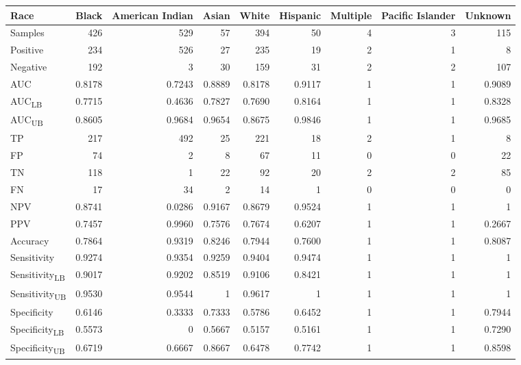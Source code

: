 \begin{tabular}{lrrrrrrrr}
\toprule
Race & Black & American Indian & Asian & White & Hispanic & Multiple & Pacific Islander & Unknown \\
\midrule
Samples & 426 & 529 & 57 & 394 & 50 & 4 & 3 & 115 \\
Positive & 234 & 526 & 27 & 235 & 19 & 2 & 1 & 8 \\
Negative & 192 & 3 & 30 & 159 & 31 & 2 & 2 & 107 \\
AUC & 0.8178 & 0.7243 & 0.8889 & 0.8178 & 0.9117 & 1 & 1 & 0.9089 \\
AUC\textsubscript{LB} & 0.7715 & 0.4636 & 0.7827 & 0.7690 & 0.8164 & 1 & 1 & 0.8328 \\
AUC\textsubscript{UB} & 0.8605 & 0.9684 & 0.9654 & 0.8675 & 0.9846 & 1 & 1 & 0.9685 \\
TP & 217 & 492 & 25 & 221 & 18 & 2 & 1 & 8 \\
FP & 74 & 2 & 8 & 67 & 11 & 0 & 0 & 22 \\
TN & 118 & 1 & 22 & 92 & 20 & 2 & 2 & 85 \\
FN & 17 & 34 & 2 & 14 & 1 & 0 & 0 & 0 \\
NPV & 0.8741 & 0.0286 & 0.9167 & 0.8679 & 0.9524 & 1 & 1 & 1 \\
PPV & 0.7457 & 0.9960 & 0.7576 & 0.7674 & 0.6207 & 1 & 1 & 0.2667 \\
Accuracy & 0.7864 & 0.9319 & 0.8246 & 0.7944 & 0.7600 & 1 & 1 & 0.8087 \\
Sensitivity & 0.9274 & 0.9354 & 0.9259 & 0.9404 & 0.9474 & 1 & 1 & 1 \\
Sensitivity\textsubscript{LB} & 0.9017 & 0.9202 & 0.8519 & 0.9106 & 0.8421 & 1 & 1 & 1 \\
Sensitivity\textsubscript{UB} & 0.9530 & 0.9544 & 1 & 0.9617 & 1 & 1 & 1 & 1 \\
Specificity & 0.6146 & 0.3333 & 0.7333 & 0.5786 & 0.6452 & 1 & 1 & 0.7944 \\
Specificity\textsubscript{LB} & 0.5573 & 0 & 0.5667 & 0.5157 & 0.5161 & 1 & 1 & 0.7290 \\
Specificity\textsubscript{UB} & 0.6719 & 0.6667 & 0.8667 & 0.6478 & 0.7742 & 1 & 1 & 0.8598 \\
\bottomrule
\end{tabular}
